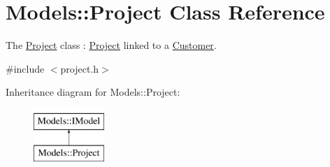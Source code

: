 \hypertarget{classModels_1_1Project}{\section{Models\-:\-:Project Class Reference}
\label{classModels_1_1Project}
}


The \hyperlink{classModels_1_1Project}{Project} class \-: \hyperlink{classModels_1_1Project}{Project} linked to a \hyperlink{classModels_1_1Customer}{Customer}.  




{\ttfamily \#include $<$project.\-h$>$}

Inheritance diagram for Models\-:\-:Project\-:\begin{figure}[H]
\begin{center}
\leavevmode
\includegraphics[height=2.000000cm]{dd/d3f/classModels_1_1Project}
\end{center}
\end{figure}
